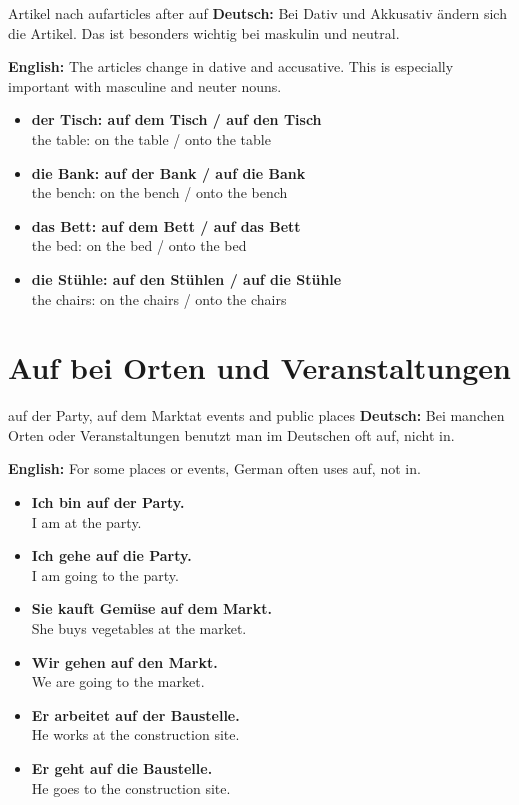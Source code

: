 \documentclass[a4paper,11pt]{article}
\newcommand{\GermanText}[1]{\textbf{Deutsch: }#1\par}
\newcommand{\EnglishText}[1]{{\small\color{SoftGray}\textbf{English: }#1\par}}
\newcommand{\ExampleItem}[2]{\item \textbf{#1}\\{\small\color{SoftGray}#2}}
\begin{document}
    \begin{grammarentry}{Artikel nach auf}{articles after auf}
        \GermanText{Bei Dativ und Akkusativ ändern sich die Artikel. Das ist besonders wichtig bei maskulin und neutral.}
        \EnglishText{The articles change in dative and accusative. This is especially important with masculine and neuter nouns.}

        \begin{exbox}
            \begin{itemize}
                \ExampleItem{der Tisch: auf dem Tisch / auf den Tisch}{the table: on the table / onto the table}
                \ExampleItem{die Bank: auf der Bank / auf die Bank}{the bench: on the bench / onto the bench}
                \ExampleItem{das Bett: auf dem Bett / auf das Bett}{the bed: on the bed / onto the bed}
                \ExampleItem{die Stühle: auf den Stühlen / auf die Stühle}{the chairs: on the chairs / onto the chairs}
            \end{itemize}
        \end{exbox}
    \end{grammarentry}

    \section{Auf bei Orten und Veranstaltungen}

    \begin{grammarentry}{auf der Party, auf dem Markt}{at events and public places}
        \GermanText{Bei manchen Orten oder Veranstaltungen benutzt man im Deutschen oft \glqq auf\grqq, nicht \glqq in\grqq.}
        \EnglishText{For some places or events, German often uses \glqq auf\grqq, not \glqq in\grqq.}

        \begin{exbox}
            \begin{itemize}
                \ExampleItem{Ich bin auf der Party.}{I am at the party.}
                \ExampleItem{Ich gehe auf die Party.}{I am going to the party.}
                \ExampleItem{Sie kauft Gemüse auf dem Markt.}{She buys vegetables at the market.}
                \ExampleItem{Wir gehen auf den Markt.}{We are going to the market.}
                \ExampleItem{Er arbeitet auf der Baustelle.}{He works at the construction site.}
                \ExampleItem{Er geht auf die Baustelle.}{He goes to the construction site.}
            \end{itemize}
        \end{exbox}
    \end{grammarentry}
\end{document}
